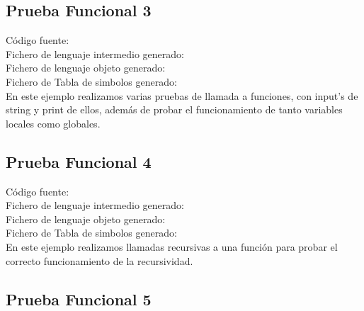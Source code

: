 \documentclass{article}[a4paper]
\begin{document}
\begin{appendices}
\subsection{Prueba Funcional 3}

Código fuente:
\\
\hspace{\parindent} Fichero de lenguaje intermedio generado:
\\
\hspace{\parindent} Fichero de lenguaje objeto generado:
\\
\hspace{\parindent} Fichero de Tabla de simbolos generado:
\\

En este ejemplo realizamos varias pruebas de llamada a funciones, con input's de string y print de ellos, además de probar el funcionamiento de tanto variables locales como globales.

\subsection{Prueba Funcional 4}

Código fuente:
\\
\hspace{\parindent} Fichero de lenguaje intermedio generado:
\\
\hspace{\parindent} Fichero de lenguaje objeto generado:
\\
\hspace{\parindent} Fichero de Tabla de simbolos generado:
\\

En este ejemplo realizamos llamadas recursivas a una función para probar el correcto funcionamiento de la recursividad.

\subsection{Prueba Funcional 5}


\end{appendices}
\end{document}
